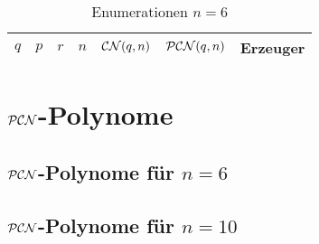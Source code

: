 \begin{longtable}[h]{llllllp{7cm}}
  \caption{Enumerationen $n=6$}\\
  $q$ & $p$ & $r$ & $n$ & $\mathcal{CN}(q,n)$ & $\mathcal{PCN}(q,n)$ & Erzeuger \\\hline
  \endhead
  
\end{longtable}


\section{$\mathcal{PCN}$-Polynome}

\tiny

\subsection{$\mathcal{PCN}$-Polynome für $n = 6$}


\begin{description}[leftmargin=0pt,labelindent=20pt,
  font=\normalsize]
  \item[$r=1$:] 
  \item[$r=2$:] 
  \item[$r=3$:] 
  \item[$r=4$:] 
  \item[$r=5$:] 
  \item[$r=6$:] 
  \item[$r=7$:] 
  \item[$r=8$:] 
  \item[$r=9$:] 
  \item[$r=10$:] 
\end{description}


\subsection{$\mathcal{PCN}$-Polynome für $n=10$}

\begin{description}[leftmargin=0pt,labelindent=20pt,
  font=\normalsize]
  \item[$r=1$:] 
               
  \item[$r=2$:] 
  \item[$r=3$:] 
  \item[$r=4$:] 
  \item[$r=5$:] 
  \item[$r=6$:] 
\end{description}



